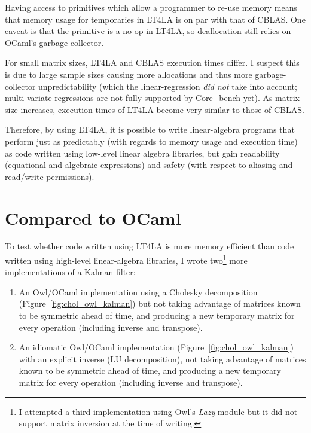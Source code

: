 Having access to primitives which allow a programmer to re-use memory means
that memory usage for temporaries in LT4LA is on par with that of CBLAS. One
caveat is that the  primitive is a no-op in LT4LA, so deallocation
still relies on OCaml's garbage-collector.

For small matrix sizes, LT4LA and CBLAS execution times differ. I suspect this
is due to large sample sizes causing more allocations and thus more
garbage-collector unpredictability (which the linear-regression \emph{did not}
take into account; multi-variate regressions are not fully supported by
Core\_bench yet). As matrix size increases, execution times of LT4LA become
very similar to those of CBLAS.

Therefore, by using LT4LA, it is possible to write linear-algebra programs that
perform just as predictably (with regards to memory usage and execution time)
as code written using low-level linear algebra libraries, but gain readability
(equational and algebraic expressions) and safety (with respect to aliasing
and read/write permissions).

\section{Compared to OCaml}

To test whether code written using LT4LA is more memory efficient than code
written using high-level linear-algebra libraries, I wrote two\footnote{I
attempted a third implementation using Owl's \emph{Lazy} module but it did
not support matrix inversion at the time of writing.} more implementations
of a Kalman filter:

\begin{enumerate}
    \item An Owl/OCaml implementation using a Cholesky decomposition
        (Figure~\ref{fig:chol_owl_kalman}) but not taking advantage of matrices
        known to be symmetric ahead of time, and producing a new temporary
        matrix for every operation (including inverse and transpose).

    \item An idiomatic Owl/OCaml implementation
        (Figure~\ref{fig:chol_owl_kalman}) with an explicit inverse (LU
        decomposition), not taking advantage of matrices known to be symmetric
        ahead of time, and producing a new temporary matrix for every operation
        (including inverse and transpose).
\end{enumerate}

